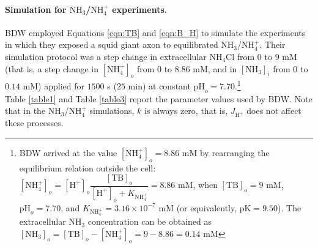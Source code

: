 \documentclass[fleqn,10pt]{physiome}
\begin{document}
\paragraph{Simulation for $\mathrm{NH_3}$/$\mathrm{NH_4^+}$ experiments.}

BDW employed Equations \ref{eqn:TB} and \ref{eqn:B_H} to simulate the experiments in which they exposed a squid giant axon to equilibrated $\mathrm{NH_3}$/$\mathrm{NH_4^+}$. Their simulation protocol was a step change in extracellular $\mathrm{NH_4Cl}$ from $0$ to $9$ mM (that is, a step change in $\mathrm{[NH_4^+]}_o$ from $0$ to $8.86$ mM, and in $\mathrm{[NH_3]}_i$ from $0$ to $0.14$ mM) applied for $1500$ s ($25$ min) at constant $\mathrm{pH}_o=7.70$.\footnote{BDW arrived at the value $\mathrm{[NH_4^+]}_o= 8.86$ mM by rearranging the equilibrium relation outside the cell: $\mathrm{[NH_4^+]}_o=\mathrm{[H^+]}_o\dfrac{\mathrm{[TB]}_o}{\mathrm{[H^+]}_o+K_\mathrm{NH_4^+}}= 8.86$ mM, when $\mathrm{[TB]}_o= 9$ mM, $\mathrm{pH}_o= 7.70$, and $K_\mathrm{NH_4^+} = 3.16\times 10^{-7}$ mM (or equivalently, $\mathrm{pK} = 9.50$). The extracellular $\mathrm{NH_3}$ concentration can be obtained as $\mathrm{[NH_3]}_o=\mathrm{[TB]}_o-\mathrm{[NH_4^+]}_o= 9-8.86 = 0.14$ mM}\\

Table \ref{table1} and Table \ref{table3} report the parameter values used by BDW. Note that in the $\mathrm{NH_3}$/$\mathrm{NH_4^+}$ simulations, $k$ is always zero, that is, $J_\mathrm{H^+}$ does not affect these processes.\\
\end{document}
